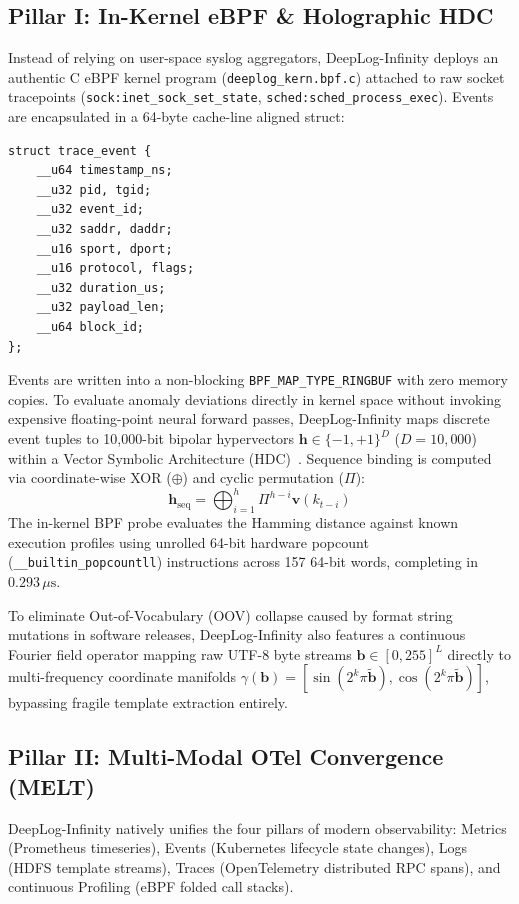 \documentclass[letterpaper,twocolumn,10pt]{article}
\begin{document}
\subsection{Pillar I: In-Kernel eBPF \& Holographic HDC}
Instead of relying on user-space syslog aggregators, DeepLog-Infinity deploys an authentic C eBPF kernel program (\texttt{deeplog\_\allowbreak kern.bpf.c}) attached to raw socket tracepoints (\texttt{sock:\allowbreak inet\_\allowbreak sock\_\allowbreak set\_\allowbreak state}, \texttt{sched:\allowbreak sched\_\allowbreak process\_\allowbreak exec}). Events are encapsulated in a 64-byte cache-line aligned struct:
\begin{small}
\begin{verbatim}
struct trace_event {
    __u64 timestamp_ns;
    __u32 pid, tgid;
    __u32 event_id;
    __u32 saddr, daddr;
    __u16 sport, dport;
    __u16 protocol, flags;
    __u32 duration_us;
    __u32 payload_len;
    __u64 block_id;
};
\end{verbatim}
\end{small}
Events are written into a non-blocking \texttt{BPF\_\allowbreak MAP\_\allowbreak TYPE\_\allowbreak RINGBUF} with zero memory copies. To evaluate anomaly deviations directly in kernel space without invoking expensive floating-point neural forward passes, DeepLog-Infinity maps discrete event tuples to 10,000-bit bipolar hypervectors $\mathbf{h} \in \{-1, +1\}^D$ ($D = 10{,}000$) within a Vector Symbolic Architecture (HDC)~\cite{kanerva2009hyperdimensional}. Sequence binding is computed via coordinate-wise XOR ($\oplus$) and cyclic permutation ($\Pi$):
\begin{equation}
\label{eq:hdc_binding}
\mathbf{h}_{\text{seq}} = \bigoplus_{i=1}^h \Pi^{h-i} \mathbf{v}(k_{t-i})
\end{equation}
The in-kernel BPF probe evaluates the Hamming distance against known execution profiles using unrolled 64-bit hardware popcount (\texttt{\_\_builtin\_popcountll}) instructions across 157 64-bit words, completing in $0.293\,\mu\text{s}$.

To eliminate Out-of-Vocabulary (OOV) collapse caused by format string mutations in software releases, DeepLog-Infinity also features a continuous Fourier field operator mapping raw UTF-8 byte streams $\mathbf{b} \in [0, 255]^L$ directly to multi-frequency coordinate manifolds $\gamma(\mathbf{b}) = [\sin(2^k \pi \tilde{\mathbf{b}}), \cos(2^k \pi \tilde{\mathbf{b}})]$, bypassing fragile template extraction entirely.

\subsection{Pillar II: Multi-Modal OTel Convergence (MELT)}
DeepLog-Infinity natively unifies the four pillars of modern observability: Metrics (Prometheus timeseries), Events (Kubernetes lifecycle state changes), Logs (HDFS template streams), Traces (OpenTelemetry distributed RPC spans), and continuous Profiling (eBPF folded call stacks). 
\end{document}

